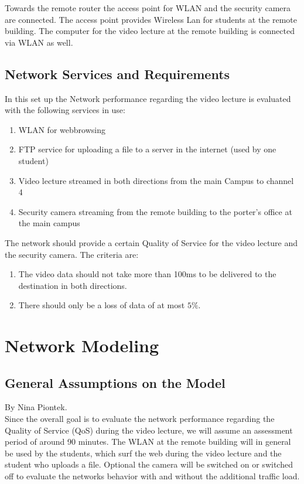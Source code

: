 \documentclass[a4paper,10pt]{book}\usepackage{graphicx}
\begin{document}
Towards the remote router the access point for WLAN and the security camera are connected.
The access point provides Wireless Lan for students at the remote building. The computer for the video lecture at the remote building 
is connected via WLAN as well.

\section{Network Services and Requirements}

In this set up the Network performance regarding the video lecture is evaluated with the following services in
use:\\
\begin{enumerate}
 \item WLAN for webbrowsing
 \item FTP service for uploading a file to a server in the internet (used by one student) 
 \item Video lecture streamed in both directions from the main Campus to channel 4
 \item Security camera streaming from the remote building to the porter's office  at the main campus
\end{enumerate}

The network should provide a certain Quality of Service for the video lecture and the security camera.
The criteria are:\\
\begin{enumerate}
 \item The video data should not take more than 100ms to be delivered to the destination in both directions.
 \item There should only be a loss of data of at most $5\%$.
\end{enumerate}

\chapter{Network Modeling}
\section{General Assumptions on the Model}
By Nina Piontek.\\

Since the overall goal is to evaluate the network performance regarding the Quality of Service (QoS) during the video lecture, we will assume an assessment period
of around 90 minutes. The WLAN at the remote building will in general be used by the students, which surf the web during the video lecture and the student 
who uploads a file. Optional the camera will be switched on or switched off to evaluate the networks behavior with and without the additional
traffic load.
\end{document}
